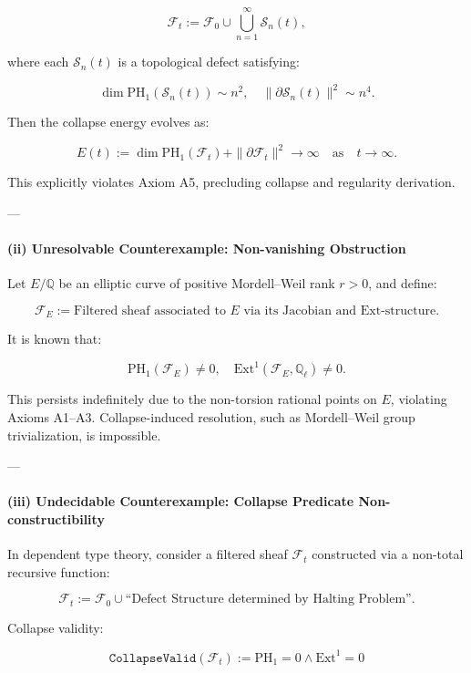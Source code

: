 \documentclass[11pt]{article}
\begin{document}
\[
\mathcal{F}_t := \mathcal{F}_0 \cup \bigcup_{n=1}^\infty \mathcal{S}_n(t),
\]

where each $\mathcal{S}_n(t)$ is a topological defect satisfying:

\[
\dim \mathrm{PH}_1(\mathcal{S}_n(t)) \sim n^2, \quad \|\partial \mathcal{S}_n(t)\|^2 \sim n^4.
\]

Then the collapse energy evolves as:

\[
E(t) := \dim \mathrm{PH}_1(\mathcal{F}_t) + \|\partial \mathcal{F}_t\|^2 \longrightarrow \infty \quad \text{as} \quad t \to \infty.
\]

This explicitly violates Axiom A5, precluding collapse and regularity derivation.

---

\paragraph{(ii) Unresolvable Counterexample: Non-vanishing Obstruction}

Let $E/\mathbb{Q}$ be an elliptic curve of positive Mordell–Weil rank $r>0$, and define:

\[
\mathcal{F}_E := \text{Filtered sheaf associated to } E \text{ via its Jacobian and Ext-structure}.
\]

It is known that:

\[
\mathrm{PH}_1(\mathcal{F}_E) \neq 0, \quad \mathrm{Ext}^1(\mathcal{F}_E, \mathbb{Q}_\ell) \neq 0.
\]

This persists indefinitely due to the non-torsion rational points on $E$, violating Axioms A1–A3.  
Collapse-induced resolution, such as Mordell–Weil group trivialization, is impossible.

---

\paragraph{(iii) Undecidable Counterexample: Collapse Predicate Non-constructibility}

In dependent type theory, consider a filtered sheaf $\mathcal{F}_t$ constructed via a non-total recursive function:

\[
\mathcal{F}_t := \mathcal{F}_0 \cup \text{``Defect Structure determined by Halting Problem''}.
\]

Collapse validity:

\[
\texttt{CollapseValid}(\mathcal{F}_t) := \mathrm{PH}_1 = 0 \wedge \mathrm{Ext}^1 = 0
\]
\end{document}
